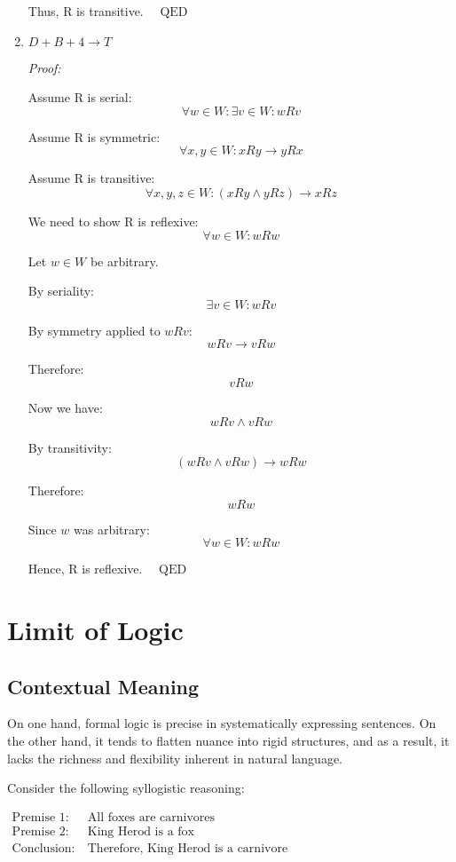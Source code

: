 \documentclass[12pt,a4paper,openany]{article}
\begin{document}
\begin{enumerate}
    Thus, R is transitive. $\quad \text{QED}$
    
    \item \textbf{$D + B + 4 \to T$}
    
    \textit{Proof:}
    
    Assume R is serial:
    $$\forall w \in W: \exists v \in W: wRv$$
    
    Assume R is symmetric:
    $$\forall x, y \in W: xRy \to yRx$$
    
    Assume R is transitive:
    $$\forall x, y, z \in W: (xRy \land yRz) \to xRz$$
    
    We need to show R is reflexive:
    $$\forall w \in W: wRw$$
    
    Let $w \in W$ be arbitrary.
    
    By seriality:
    $$\exists v \in W: wRv$$
    
    By symmetry applied to $wRv$:
    $$wRv \to vRw$$
    
    Therefore:
    $$vRw$$
    
    Now we have:
    $$wRv \land vRw$$
    
    By transitivity:
    $$(wRv \land vRw) \to wRw$$
    
    Therefore:
    $$wRw$$
    
    Since $w$ was arbitrary:
    $$\forall w \in W: wRw$$
    
    Hence, R is reflexive. $\quad \text{QED}$
\end{enumerate}

\section{Limit of Logic}

\subsection{Contextual Meaning}\label{contextual-meaning}

On one hand, formal logic is precise in systematically expressing
sentences. On the other hand, it tends to flatten nuance into rigid
structures, and as a result, it lacks the richness and flexibility
inherent in natural language.

Consider the following syllogistic reasoning:

$
\begin{aligned}
\text{Premise 1:} \ & \text{All foxes are carnivores} \\
\text{Premise 2:} \ & \text{King Herod is a fox} \\
\text{Conclusion:} \ & \text{Therefore, King Herod is a carnivore}
\end{aligned}
$
\end{document}
